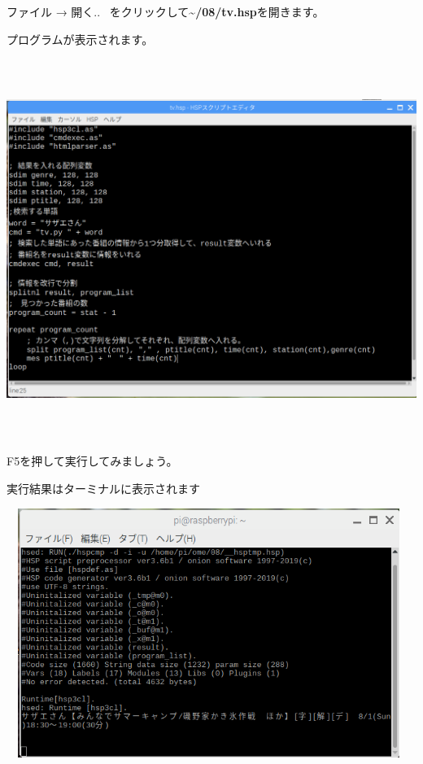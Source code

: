 \documentclass[a4paper,12pt,dvipdfmx]{jarticle}
\begin{document}
ファイル → 開く..
\ をクリックして\textbf{\~{}/08/tv.hsp}を開きます。

プログラムが表示されます。



\begin{center}
\includegraphics[width=15.284cm,height=12.345cm]{textbook-img043.png}

\end{center}


\bigskip


\bigskip

F5を押して実行してみましょう。

実行結果はターミナルに表示されます



\begin{center}
\includegraphics[width=13.157cm,height=8.102cm]{textbook-img044.png}

\end{center}
\end{document}
